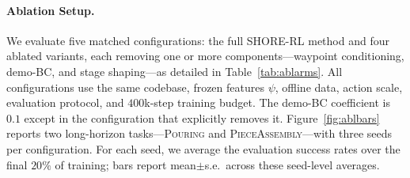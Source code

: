 \documentclass[letterpaper]{article} %
\begin{document}
\paragraph{Ablation Setup.}
We evaluate five matched configurations: the full SHORE-RL method and four
ablated variants, each removing one or more components---waypoint conditioning,
demo-BC, and stage shaping---as detailed in Table~\ref{tab:ablarms}.
All configurations use the same codebase, frozen features
$\psi$, offline data, action scale, evaluation protocol, and $400$k-step
training budget. The demo-BC coefficient is $0.1$ except in the configuration that
explicitly removes it. Figure~\ref{fig:ablbars} reports two long-horizon
tasks---\textsc{Pouring} and \textsc{PieceAssembly}---with
three seeds per configuration. For each seed, we average the evaluation success
rates over the final $20\%$ of training; bars report mean$\pm$s.e.\ across these
seed-level averages.

\begin{table}[t]
\centering\small\setlength{\tabcolsep}{4pt}
\caption{Matched component-ablation configurations with fixed action scale, evaluation
protocol, and comparison budget. SHORE-RL uses waypoint conditioning, demo-BC, and the
hand-designed per-stage bonus. The first three variants remove the listed
component or pair of components; the last keeps the waypoint while removing
both demo-BC and stage shaping.}
\label{tab:ablarms}
\end{table}
\end{document}
